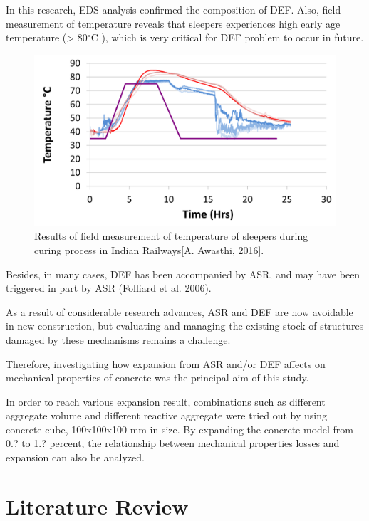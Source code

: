 In this research, EDS analysis confirmed the composition of DEF. Also, field measurement of temperature reveals that sleepers experiences high early age temperature (> 80$^\circ$C ), which is very critical for DEF problem to occur in future.

    \begin{figure}[ht!]
        \centering
        \includegraphics[width=.8\linewidth]{Files/Background/Anupam_2.png}
        \caption{Results of field measurement of temperature
 of sleepers during curing process in Indian Railways[A. Awasthi, 2016].}
        \label{fig:Awasthi_2}
    \end{figure}

Besides, in many cases, DEF has been accompanied by ASR, and may have been triggered in part by ASR (Folliard et al. 2006).

As a result of considerable research advances, ASR and DEF are now avoidable in new construction, but evaluating and managing the existing stock of structures damaged by these mechanisms remains a challenge.

Therefore, investigating how expansion from ASR and/or DEF affects on mechanical properties of concrete was the principal aim of this study.

In order to reach various expansion result, combinations such as different aggregate volume and different reactive aggregate were tried out by using concrete cube, 100x100x100 mm in size. By expanding the concrete model from 0.? to 1.? percent, the relationship between mechanical properties losses and expansion can also be analyzed.

\section{Literature Review}

